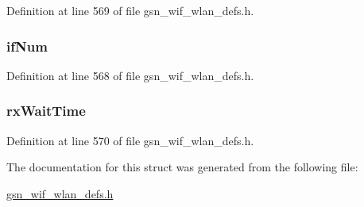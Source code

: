 Definition at line 569 of file gsn\_\-wif\_\-wlan\_\-defs.h.

\hypertarget{a00310_ab582fd779b13f74e06e2491389a60aa0}{
\subsubsection[{ifNum}]{ {\bf ifNum}}}
\label{a00310_ab582fd779b13f74e06e2491389a60aa0}


Definition at line 568 of file gsn\_\-wif\_\-wlan\_\-defs.h.

\hypertarget{a00310_a5e99b08f817fc8c7382a7f48f61a44bb}{
\subsubsection[{rxWaitTime}]{ {\bf rxWaitTime}}}
\label{a00310_a5e99b08f817fc8c7382a7f48f61a44bb}


Definition at line 570 of file gsn\_\-wif\_\-wlan\_\-defs.h.



The documentation for this struct was generated from the following file:\begin{DoxyCompactItemize}
\item 
\hyperlink{a00613}{gsn\_\-wif\_\-wlan\_\-defs.h}\end{DoxyCompactItemize}
